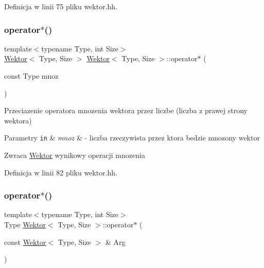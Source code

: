 Definicja w linii 75 pliku wektor.\+hh.

\mbox{\label{class_wektor_ac7ea75dec9cca3926713d1fa0d76cd4f}} 
\subsubsection{\texorpdfstring{operator$\ast$()}{operator*()}\hspace{0.1cm}{\footnotesize\ttfamily [1/2]}}
{\footnotesize\ttfamily template$<$typename Type, int Size$>$ \\
\hyperlink{class_wektor}{Wektor}$<$ Type, Size $>$ \hyperlink{class_wektor}{Wektor}$<$ Type, Size $>$\+::operator$\ast$ (\begin{DoxyParamCaption}\item[{const Type}]{mnoz }\end{DoxyParamCaption})}



Przeciazenie operatora mnozenia wektora przez liczbe (liczba z prawej strony wektora) 


\begin{DoxyParams}[1]{Parametry}
\mbox{\tt in}  & {\em mnoz} & -\/ liczba rzeczywista przez ktora bedzie mnozony wektor \\
\hline
\end{DoxyParams}
\begin{DoxyReturn}{Zwraca}
\hyperlink{class_wektor}{Wektor} wynikowy operacji mnozenia 
\end{DoxyReturn}


Definicja w linii 82 pliku wektor.\+hh.

\mbox{\label{class_wektor_ab786f148ed27e5af9cb64fbc1efcc8d0}} 
\subsubsection{\texorpdfstring{operator$\ast$()}{operator*()}\hspace{0.1cm}{\footnotesize\ttfamily [2/2]}}
{\footnotesize\ttfamily template$<$typename Type, int Size$>$ \\
Type \hyperlink{class_wektor}{Wektor}$<$ Type, Size $>$\+::operator$\ast$ (\begin{DoxyParamCaption}\item[{const \hyperlink{class_wektor}{Wektor}$<$ Type, Size $>$ \&}]{Arg }\end{DoxyParamCaption})}



